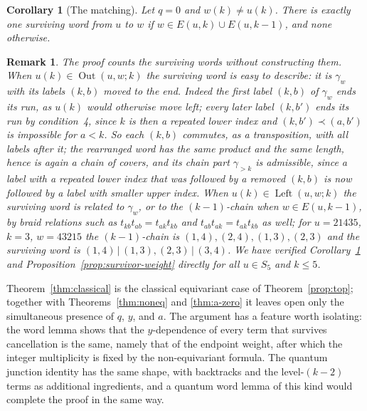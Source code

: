 \documentclass[11pt]{article}
\newtheorem{corollary}[proposition]{Corollary}
\newtheorem{remark}[proposition]{Remark}
\newcommand{\Left}{\operatorname{Left}}
\newcommand{\Out}{\operatorname{Out}}
\begin{document}
\begin{corollary}[The matching]\label{cor:matching}
Let $q=0$ and $w(k)\neq u(k)$. There is exactly one surviving word
from $u$ to $w$ if $w\in E(u,k)\cup E(u,k-1)$, and none otherwise.
\end{corollary}

\begin{remark}
The proof counts the surviving words without constructing them. When
$u(k)\in\Out(u,w;k)$ the surviving word is easy to describe: it is
$\gamma_w$ with its labels $(k,b)$ moved to the end. Indeed the first
label $(k,b)$ of $\gamma_w$ ends its run, as $u(k)$ would otherwise
move left; every later label $(k,b')$ ends its run by condition~4,
since $k$ is then a repeated lower index and $(k,b')\prec(a,b')$ is
impossible for $a<k$. So each $(k,b)$ commutes, as a transposition,
with all labels after it; the rearranged word has the same product
and the same length, hence is again a chain of covers, and its chain
part $\gamma_{>k}$ is admissible, since a label with a repeated lower
index that was followed by a removed $(k,b)$ is now followed by a
label with smaller upper index. When $u(k)\in\Left(u,w;k)$ the surviving word is related
to $\gamma_w$, or to the $(k-1)$-chain when $w\in E(u,k-1)$, by braid
relations such as $t_{kb}t_{ab}=t_{ak}t_{kb}$ and
$t_{ab}t_{ak}=t_{ak}t_{kb}$ as well; for $u=21435$, $k=3$, $w=43215$
the $(k-1)$-chain is $(1,4),(2,4),(1,3),(2,3)$ and the surviving word is
$(1,4)\,|\,(1,3),(2,3)\,|\,(3,4)$. We have verified
Corollary~\ref{cor:matching} and Proposition~\ref{prop:survivor-weight}
directly for all $u\in S_5$ and $k\leq5$.
\end{remark}

Theorem~\ref{thm:classical} is the classical equivariant case of
Theorem~\ref{prop:top}; together with Theorems~\ref{thm:noneq} and
\ref{thm:a-zero} it leaves open only the simultaneous presence of
$q$, $y$, and $a$. The argument has a feature worth isolating: the
word lemma shows that the $y$-dependence of every term that survives
cancellation is the same, namely that of the endpoint weight, after
which the integer multiplicity is fixed by the non-equivariant
formula. The quantum junction identity has the same shape, with
backtracks and the level-$(k-2)$ terms as additional ingredients, and
a quantum word lemma of this kind would complete the proof in the
same way.
\end{document}
